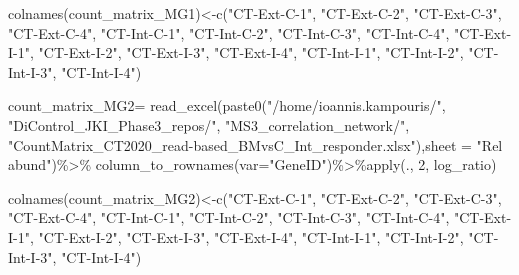 \documentclass[
]{article}
\newenvironment{Shaded}{\begin{snugshade}}{\end{snugshade}}
\newcommand{\AttributeTok}[1]{\textcolor[rgb]{0.77,0.63,0.00}{#1}}
\newcommand{\DecValTok}[1]{\textcolor[rgb]{0.00,0.00,0.81}{#1}}
\newcommand{\FunctionTok}[1]{\textcolor[rgb]{0.00,0.00,0.00}{#1}}
\newcommand{\NormalTok}[1]{#1}
\newcommand{\OtherTok}[1]{\textcolor[rgb]{0.56,0.35,0.01}{#1}}
\newcommand{\SpecialCharTok}[1]{\textcolor[rgb]{0.00,0.00,0.00}{#1}}
\newcommand{\StringTok}[1]{\textcolor[rgb]{0.31,0.60,0.02}{#1}}
\begin{document}
\begin{Shaded}
\begin{Highlighting}[]
\FunctionTok{colnames}\NormalTok{(count\_matrix\_MG1)}\OtherTok{\textless{}{-}}\FunctionTok{c}\NormalTok{(}\StringTok{"CT{-}Ext{-}C{-}1"}\NormalTok{, }\StringTok{"CT{-}Ext{-}C{-}2"}\NormalTok{, }\StringTok{"CT{-}Ext{-}C{-}3"}\NormalTok{, }\StringTok{"CT{-}Ext{-}C{-}4"}\NormalTok{, }\StringTok{"CT{-}Int{-}C{-}1"}\NormalTok{, }\StringTok{"CT{-}Int{-}C{-}2"}\NormalTok{, }\StringTok{"CT{-}Int{-}C{-}3"}\NormalTok{, }\StringTok{"CT{-}Int{-}C{-}4"}\NormalTok{, }\StringTok{"CT{-}Ext{-}I{-}1"}\NormalTok{, }\StringTok{"CT{-}Ext{-}I{-}2"}\NormalTok{, }\StringTok{"CT{-}Ext{-}I{-}3"}\NormalTok{, }\StringTok{"CT{-}Ext{-}I{-}4"}\NormalTok{, }\StringTok{"CT{-}Int{-}I{-}1"}\NormalTok{, }\StringTok{"CT{-}Int{-}I{-}2"}\NormalTok{, }\StringTok{"CT{-}Int{-}I{-}3"}\NormalTok{, }\StringTok{"CT{-}Int{-}I{-}4"}\NormalTok{)}


\NormalTok{count\_matrix\_MG2}\OtherTok{=} \FunctionTok{read\_excel}\NormalTok{(}\FunctionTok{paste0}\NormalTok{(}\StringTok{"/home/ioannis.kampouris/"}\NormalTok{,}
\StringTok{"DiControl\_JKI\_Phase3\_repos/"}\NormalTok{,}
\StringTok{"MS3\_correlation\_network/"}\NormalTok{,}
\StringTok{"CountMatrix\_CT2020\_read{-}based\_BMvsC\_Int\_responder.xlsx"}\NormalTok{),}\AttributeTok{sheet =} \StringTok{"Rel abund"}\NormalTok{)}\SpecialCharTok{\%\textgreater{}\%}
  \FunctionTok{column\_to\_rownames}\NormalTok{(}\AttributeTok{var=}\StringTok{"GeneID"}\NormalTok{)}\SpecialCharTok{\%\textgreater{}\%}\FunctionTok{apply}\NormalTok{(., }\DecValTok{2}\NormalTok{, log\_ratio)}

\FunctionTok{colnames}\NormalTok{(count\_matrix\_MG2)}\OtherTok{\textless{}{-}}\FunctionTok{c}\NormalTok{(}\StringTok{"CT{-}Ext{-}C{-}1"}\NormalTok{, }\StringTok{"CT{-}Ext{-}C{-}2"}\NormalTok{, }\StringTok{"CT{-}Ext{-}C{-}3"}\NormalTok{, }\StringTok{"CT{-}Ext{-}C{-}4"}\NormalTok{, }\StringTok{"CT{-}Int{-}C{-}1"}\NormalTok{, }\StringTok{"CT{-}Int{-}C{-}2"}\NormalTok{, }\StringTok{"CT{-}Int{-}C{-}3"}\NormalTok{, }\StringTok{"CT{-}Int{-}C{-}4"}\NormalTok{, }\StringTok{"CT{-}Ext{-}I{-}1"}\NormalTok{, }\StringTok{"CT{-}Ext{-}I{-}2"}\NormalTok{, }\StringTok{"CT{-}Ext{-}I{-}3"}\NormalTok{, }\StringTok{"CT{-}Ext{-}I{-}4"}\NormalTok{, }\StringTok{"CT{-}Int{-}I{-}1"}\NormalTok{, }\StringTok{"CT{-}Int{-}I{-}2"}\NormalTok{, }\StringTok{"CT{-}Int{-}I{-}3"}\NormalTok{, }\StringTok{"CT{-}Int{-}I{-}4"}\NormalTok{)}




\end{Highlighting}
\end{Shaded}
\end{document}
